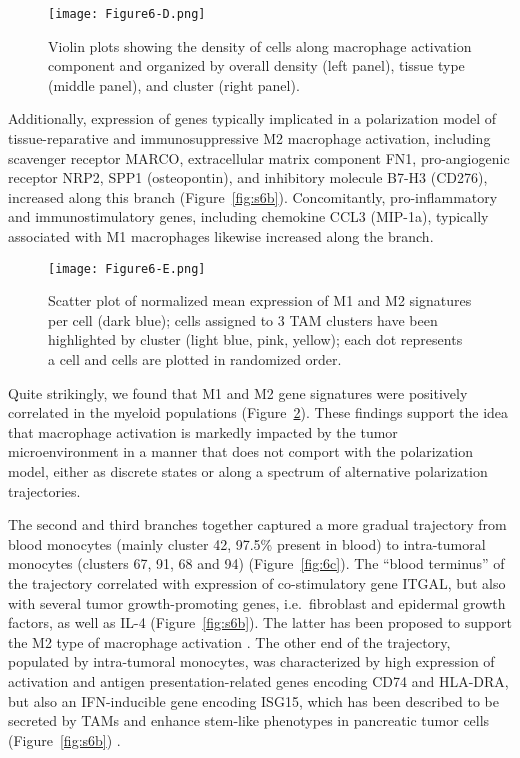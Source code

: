 \begin{figure}
\centering
\texttt{[image: Figure6-D.png]}
\caption{Violin plots showing the density of cells along macrophage activation component and organized by overall density (left panel), tissue type (middle panel), and cluster (right panel).
}
\label{fig:6d}
\end{figure}

Additionally, expression of genes typically implicated in a polarization model of tissue-reparative and immunosuppressive M2 macrophage activation, including scavenger receptor MARCO, extracellular matrix component FN1, pro-angiogenic receptor NRP2, SPP1 (osteopontin), and inhibitory molecule B7-H3 (CD276), increased along this branch (Figure~\ref{fig:s6b}).
Concomitantly, pro-inflammatory and immunostimulatory genes, including chemokine CCL3 (MIP-1a), typically associated with M1 macrophages likewise increased along the branch.

\begin{figure}
\centering
\texttt{[image: Figure6-E.png]}
\caption{Scatter plot of normalized mean expression of M1 and M2 signatures per cell (dark blue); cells assigned to 3 TAM clusters have been highlighted by cluster (light blue, pink, yellow); each dot represents a cell and cells are plotted in randomized order.
}
\label{fig:6e}
\end{figure}

Quite strikingly, we found that M1 and M2 gene signatures were positively correlated in the myeloid populations (Figure~\ref{fig:6e}).
These findings support the idea that macrophage activation is markedly impacted by the tumor microenvironment in a manner that does not comport with the polarization model, either as discrete states or along a spectrum of alternative polarization trajectories.

The second and third branches together captured a more gradual trajectory from blood monocytes (mainly cluster 42, 97.5\% present in blood) to intra-tumoral monocytes (clusters 67, 91, 68 and 94) (Figure~\ref{fig:6c}).
The ``blood terminus'' of the trajectory correlated with expression of co-stimulatory gene ITGAL, but also with several tumor growth-promoting genes, i.e.\ fibroblast and epidermal growth factors, as well as IL-4 (Figure~\ref{fig:s6b}).
The latter has been proposed to support the M2 type of macrophage activation \citep{Mantovani2013,Mills2000,Murray2014}.
The other end of the trajectory, populated by intra-tumoral monocytes, was characterized by high expression of activation and antigen presentation-related genes encoding CD74 and HLA-DRA, but also an IFN-inducible gene encoding ISG15, which has been described to be secreted by TAMs and enhance stem-like phenotypes in pancreatic tumor cells (Figure~\ref{fig:s6b}) \citep{Sainz2014}.

